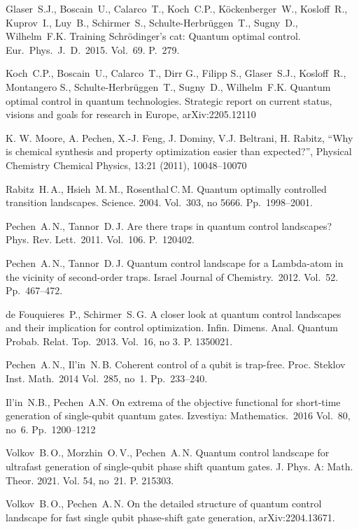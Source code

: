 \documentclass[12pt]{llncs}
\begin{document}
\begin{thebibliography}{99} %
  Glaser~S.J., Boscain~U., Calarco~T., Koch~C.P., K\"{o}ckenberger~W., Kosloff~R., Kuprov~I., Luy~B., Schirmer~S., Schulte-Herbr\"{u}ggen~T., Sugny~D., Wilhelm~F.K. Training Schr\"{o}dinger's cat: Quantum optimal control. Eur.~Phys.~J.~D.~2015. Vol.~69. P.~279.

 Koch~C.P., Boscain~U., Calarco~T., Dirr G., Filipp S., Glaser~S.J., Kosloff~R., Montangero S.,
Schulte-Herbr\"{u}ggen~T.,  Sugny~D., Wilhelm~F.K.  Quantum optimal control in quantum technologies. Strategic report on current status, visions and goals for research in Europe, arXiv:2205.12110

K. W. Moore, A. Pechen, X.-J. Feng, J. Dominy, V.J. Beltrani, H. Rabitz, “Why is chemical synthesis and property optimization easier than expected?”, Physical Chemistry Chemical Physics, 13:21 (2011), 10048–10070

 Rabitz~H.\,A., Hsieh~M.\,M., Rosenthal\,C.\,M.  Quantum optimally controlled transition landscapes. Science. 2004. Vol.~303, no 5666. Pp.~1998--2001.

 Pechen~A.\,N., Tannor~D.\,J. Are there traps in quantum control landscapes? Phys. Rev. Lett.~2011. Vol.~106. P.~120402.

Pechen~A.\,N., Tannor~D.\,J. Quantum control landscape for a Lambda-atom in the vicinity of second-order traps. Israel Journal of Chemistry.~2012.  Vol.~52. Pp.~467--472.

de Fouquieres~P., Schirmer~S.\,G. A closer look at quantum control landscapes and their implication for control optimization. Infin. Dimens. Anal. Quantum Probab. Relat. Top.~2013. Vol.~16, no 3. P. 1350021.

Pechen~A.\,N., Il'in~N.\,B. Coherent control of a qubit is trap-free. Proc. Steklov Inst. Math.~2014 Vol.~285, no~1.  Pp.~233--240. 

Il'in~N.B., Pechen~A.N.  On extrema of the objective functional for short-time generation of single-qubit quantum gates. Izvestiya: Mathematics.~2016 Vol.~80, no~6. Pp.~1200--1212

 Volkov~B.\,O.,  Morzhin~O.\,V., Pechen~A.\,N. Quantum control landscape for ultrafast generation of single-qubit phase shift quantum gates. J. Phys. A: Math. Theor. 2021. Vol. 54, no~21. P. 215303.

 Volkov~B.\,O., Pechen~A.\,N. On the detailed structure of quantum control landscape for fast single qubit phase-shift gate generation, arXiv:2204.13671.

\end{thebibliography}
\end{document}
